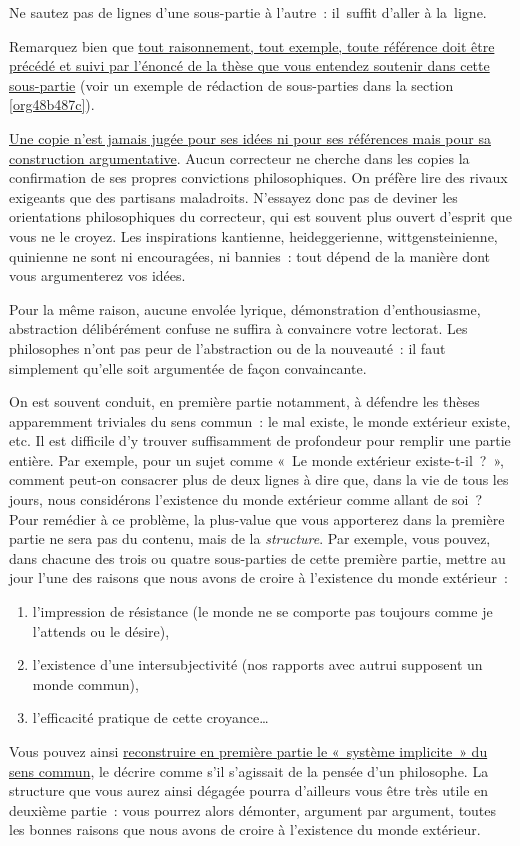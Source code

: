 \documentclass[a4paper,12pt]{article}
\begin{document}
Ne sautez pas de lignes d'une sous-partie à l'autre : il suffit d'aller
à la ligne.

Remarquez bien que \uline{tout raisonnement, tout exemple, toute référence
doit être précédé et suivi par l'énoncé de la thèse que vous entendez
soutenir dans cette sous-partie} (voir un exemple de rédaction de
sous-parties dans la section \ref{org48b487c}).

\uline{Une copie n'est jamais jugée pour ses idées ni pour ses références mais
pour sa construction argumentative}. Aucun correcteur ne cherche dans
les copies la confirmation de ses propres convictions philosophiques. On
préfère lire des rivaux exigeants que des partisans maladroits.
N'essayez donc pas de deviner les orientations philosophiques du
correcteur, qui est souvent plus ouvert d'esprit que vous ne le croyez.
Les inspirations kantienne, heideggerienne, wittgensteinienne, quinienne
ne sont ni encouragées, ni bannies : tout dépend de la manière dont vous
argumenterez vos idées.

Pour la même raison, aucune envolée lyrique, démonstration
d'enthousiasme, abstraction délibérément confuse ne suffira à convaincre
votre lectorat. Les philosophes n'ont pas peur de l'abstraction ou de la
nouveauté : il faut simplement qu'elle soit argumentée de façon
convaincante.

On est souvent conduit, en première partie notamment, à défendre les
thèses apparemment triviales du sens commun : le mal existe, le monde
extérieur existe, etc. Il est difficile d'y trouver suffisamment de
profondeur pour remplir une partie entière. Par exemple, pour un sujet
comme « Le monde extérieur existe-t-il ? », comment peut-on consacrer
plus de deux lignes à dire que, dans la vie de tous les jours, nous
considérons l'existence du monde extérieur comme allant de soi ?
Pour remédier à ce problème, la plus-value que vous apporterez dans la
première partie ne sera pas du contenu, mais de la \emph{structure}. Par
exemple, vous pouvez, dans chacune des trois ou quatre sous-parties de
cette première partie, mettre au jour l'une des raisons que nous avons
de croire à l'existence du monde extérieur : 
\begin{enumerate}
\item l'impression de résistance (le monde ne se comporte pas toujours
comme je l'attends ou le désire),
\item l'existence d'une intersubjectivité (nos rapports avec autrui
supposent un monde commun),
\item l'efficacité pratique de cette croyance\ldots{}
\end{enumerate}
Vous pouvez ainsi \uline{reconstruire en première partie le « système
implicite » du sens commun}, le décrire comme s'il s'agissait de la
pensée d'un philosophe. La structure que vous aurez ainsi dégagée pourra
d'ailleurs vous être très utile en deuxième partie : vous pourrez alors
démonter, argument par argument, toutes les bonnes raisons que nous
avons de croire à l'existence du monde extérieur.
\end{document}
